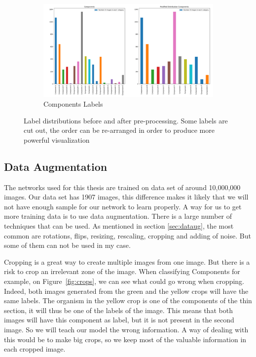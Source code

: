 \begin{figure}
\begin{subfigure}{.5\textwidth}
  \centering
  \includegraphics[width=.8\linewidth]{figures/03-Components.PNG}
  \caption{Components Labels}
  \label{fig:compolab}
\end{subfigure}
\caption[Pre processing of labels]{Label distributions before and after pre-processing. Some labels are cut out,  the order can be re-arranged in order to produce more powerful visualization}
\label{fig:labelsdistrib}
\end{figure}

\subsection{Data Augmentation}
The networks used for this thesis are trained on data set of around 10,000,000 images. Our data set has 1907 images, this difference makes it likely that we will not have enough sample for our network to learn properly. A way for us to get more training data is to use data augmentation.  There is a  large number of techniques that can be used. As mentioned in section \ref{sec:dataug}, the most common are rotations, flips, resizing, rescaling, cropping and adding of noise. But some of them can not be used in my case. 

Cropping is a great way to create multiple images from one image. But there is a risk to crop an irrelevant zone of the image. When classifying Components for example, on Figure~\ref{fig:crops}, we can see what could go wrong when cropping. Indeed, both images generated from the green and the yellow crops will have the same labels. The organism in the yellow crop is one of the components of the thin section, it will thus be one of the labels of the image. This means that both images will have this component as label, but it is not present in the second image. So we will teach our model the wrong information. A way of dealing with this would be to make big crops, so we keep most of the valuable information in each cropped image.  

